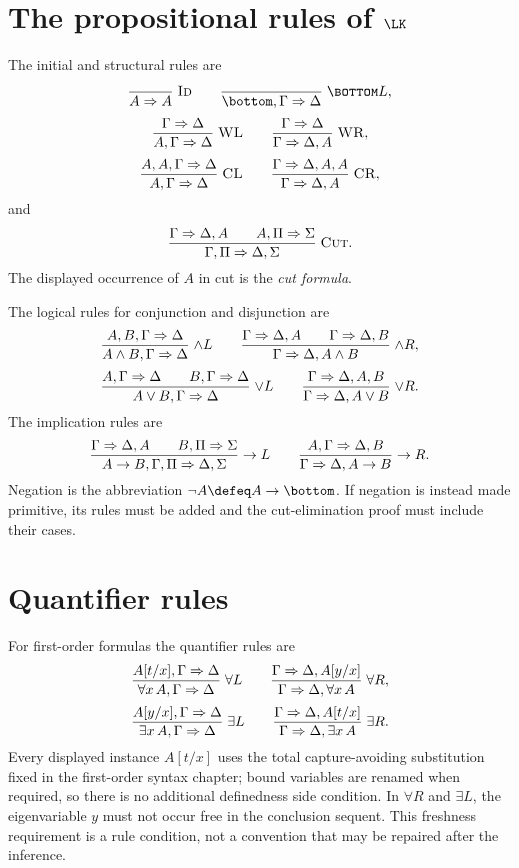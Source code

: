 \section[The propositional rules of LK]{The propositional rules of \(\LK\)}
\label{sec:lk-lj-02}

The initial and structural rules are
\[
\frac{}{A\Rightarrow A}\;\textsc{Id}
\qquad
\frac{}{\bottom,\Gamma\Rightarrow\Delta}\;\textsc{\(\bottom L\)},
\]
\[
\frac{\Gamma\Rightarrow\Delta}
     {A,\Gamma\Rightarrow\Delta}\;\textsc{WL}
\qquad
\frac{\Gamma\Rightarrow\Delta}
     {\Gamma\Rightarrow\Delta,A}\;\textsc{WR},
\]
\[
\frac{A,A,\Gamma\Rightarrow\Delta}
     {A,\Gamma\Rightarrow\Delta}\;\textsc{CL}
\qquad
\frac{\Gamma\Rightarrow\Delta,A,A}
     {\Gamma\Rightarrow\Delta,A}\;\textsc{CR},
\]
and
\[
\frac{\Gamma\Rightarrow\Delta,A
      \qquad
      A,\Pi\Rightarrow\Sigma}
     {\Gamma,\Pi\Rightarrow\Delta,\Sigma}\;\textsc{Cut}.
\]
The displayed occurrence of \(A\) in cut is the \emph{cut formula}.

The logical rules for conjunction and disjunction are
\[
\frac{A,B,\Gamma\Rightarrow\Delta}
     {A\land B,\Gamma\Rightarrow\Delta}\;\textsc{\(\land L\)}
\qquad
\frac{\Gamma\Rightarrow\Delta,A
      \qquad
      \Gamma\Rightarrow\Delta,B}
     {\Gamma\Rightarrow\Delta,A\land B}\;\textsc{\(\land R\)},
\]
\[
\frac{A,\Gamma\Rightarrow\Delta
      \qquad
      B,\Gamma\Rightarrow\Delta}
     {A\lor B,\Gamma\Rightarrow\Delta}\;\textsc{\(\lor L\)}
\qquad
\frac{\Gamma\Rightarrow\Delta,A,B}
     {\Gamma\Rightarrow\Delta,A\lor B}\;\textsc{\(\lor R\)}.
\]
The implication rules are
\[
\frac{\Gamma\Rightarrow\Delta,A
      \qquad
      B,\Pi\Rightarrow\Sigma}
     {A\to B,\Gamma,\Pi\Rightarrow\Delta,\Sigma}
     \;\textsc{\(\to L\)}
\qquad
\frac{A,\Gamma\Rightarrow\Delta,B}
     {\Gamma\Rightarrow\Delta,A\to B}
     \;\textsc{\(\to R\)}.
\]
Negation is the abbreviation \(\neg A\defeq A\to\bottom\).  If negation is
instead made primitive, its rules must be added and the cut-elimination proof
must include their cases.

\section{Quantifier rules}
\label{sec:lk-lj-03}

For first-order formulas the quantifier rules are
\[
\frac{A[t/x],\Gamma\Rightarrow\Delta}
     {\forall x\,A,\Gamma\Rightarrow\Delta}\;\textsc{\(\forall L\)}
\qquad
\frac{\Gamma\Rightarrow\Delta,A[y/x]}
     {\Gamma\Rightarrow\Delta,\forall x\,A}\;\textsc{\(\forall R\)},
\]
\[
\frac{A[y/x],\Gamma\Rightarrow\Delta}
     {\exists x\,A,\Gamma\Rightarrow\Delta}\;\textsc{\(\exists L\)}
\qquad
\frac{\Gamma\Rightarrow\Delta,A[t/x]}
     {\Gamma\Rightarrow\Delta,\exists x\,A}\;\textsc{\(\exists R\)}.
\]
Every displayed instance \(A[t/x]\) uses the total capture-avoiding
substitution fixed in the first-order syntax chapter; bound variables are
renamed when required, so there is no additional definedness side condition.
In \(\forall R\) and \(\exists L\), the eigenvariable \(y\) must not occur
free in the conclusion sequent.  This freshness requirement is a rule
condition, not a convention that may be repaired after the inference.

